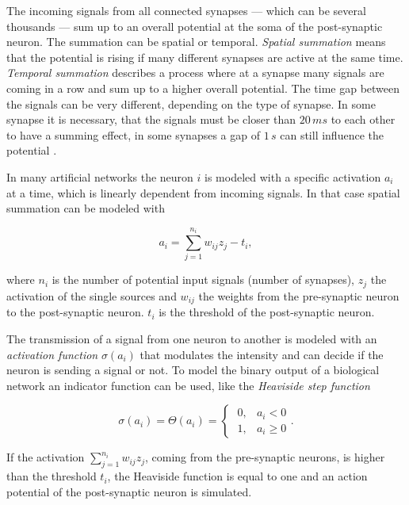 The incoming signals from all connected synapses --- which can be several thousands \parencite[p. 89]{schandry2007biologische} --- sum up to an overall potential at the soma of the post-synaptic neuron. The summation can be spatial or temporal. \emph{Spatial summation} means that the potential is rising if many different synapses are active at the same time. \emph{Temporal summation} describes a process where at a synapse many signals are coming in a row and sum up to a higher overall potential. The time gap between the signals can be very different, depending on the type of synapse. In some synapse it is necessary, that the signals must be closer than $20\,ms$ to each other to have a summing effect, in some synapses a gap of $1\,s$ can still influence the potential \parencite[p. 92]{schandry2007biologische}.

In many artificial networks the neuron $i$ is modeled with a specific activation $a_i$ at a time, which is linearly dependent from incoming signals. In that case spatial summation can be modeled with

\begin{equation}
\label{eq:activation}
a_i = \sum_{j=1}^{n_i} w_{ij} z_{j} - t_i,
\end{equation}

where $n_i$ is the number of potential input signals (number of synapses), $z_{j}$ the activation of the single sources and $w_{ij}$ the weights from the pre-synaptic neuron to the post-synaptic neuron. $t_i$ is the threshold of the post-synaptic neuron.

The transmission of a signal from one neuron to another is modeled with an \emph{activation function} $\sigma(a_i)$ that modulates the intensity and can decide if the neuron is sending a signal or not. To model the binary output of a biological network an indicator function can be used, like the \emph{Heaviside step function}


\begin{equation}
\label{eq:heavi}
\sigma(a_i) = \Theta(a_i) = \begin{cases}
\;0, & a_i < 0\\
\;1, & a_i \ge 0
\end{cases}.
\end{equation}

If the activation $\sum_{j=1}^{n_i} w_{ij} z_{j}$, coming from the pre-synaptic neurons, is higher than the threshold $t_i$, the Heaviside function is equal to one and an action potential of the post-synaptic neuron is simulated.

